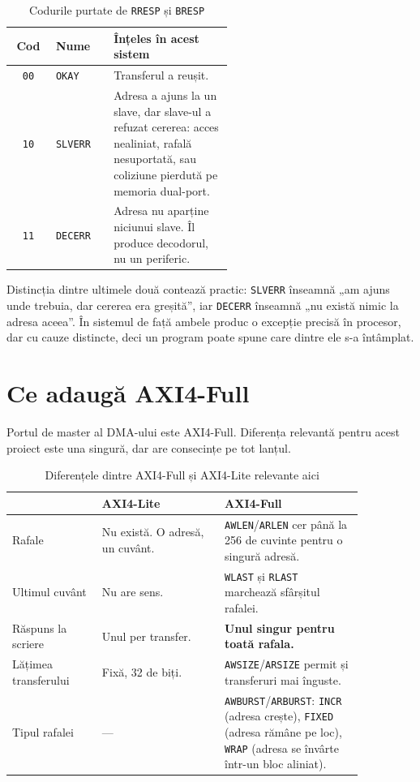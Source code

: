 \documentclass[11pt,openany]{report}
\newcommand{\sig}[1]{\texttt{#1}}
\begin{document}
\begin{table}[H]
\centering
\caption{Codurile purtate de \sig{RRESP} și \sig{BRESP}}
\label{tab:axiresp}
\small
\begin{tabular}{@{}clL{0.54\linewidth}@{}}
\toprule
\textbf{Cod} & \textbf{Nume} & \textbf{Înțeles în acest sistem} \\
\midrule
\texttt{00} & \sig{OKAY}   & Transferul a reușit. \\
\texttt{10} & \sig{SLVERR} & Adresa a ajuns la un slave, dar slave-ul a refuzat
              cererea: acces nealiniat, rafală nesuportată, sau coliziune
              pierdută pe memoria dual-port. \\
\texttt{11} & \sig{DECERR} & Adresa nu aparține niciunui slave. Îl produce
              decodorul, nu un periferic. \\
\bottomrule
\end{tabular}
\end{table}

Distincția dintre ultimele două contează practic: \sig{SLVERR} înseamnă „am
ajuns unde trebuia, dar cererea era greșită”, iar \sig{DECERR} înseamnă „nu
există nimic la adresa aceea”. În sistemul de față ambele produc o excepție
precisă în procesor, dar cu cauze distincte, deci un program poate spune care
dintre ele s-a întâmplat.

\section{Ce adaugă AXI4-Full}
\label{sec:axifull}

Portul de master al DMA-ului este AXI4-Full. Diferența relevantă pentru acest
proiect este una singură, dar are consecințe pe tot lanțul.

\begin{table}[H]
\centering
\caption{Diferențele dintre AXI4-Full și AXI4-Lite relevante aici}
\label{tab:fullvslite}
\small
\begin{tabular}{@{}L{0.22\linewidth}L{0.30\linewidth}L{0.34\linewidth}@{}}
\toprule
 & \textbf{AXI4-Lite} & \textbf{AXI4-Full} \\
\midrule
Rafale & Nu există. O adresă, un cuvânt. &
  \sig{AWLEN}/\sig{ARLEN} cer până la 256 de cuvinte pentru o singură adresă. \\
\addlinespace
Ultimul cuvânt & Nu are sens. &
  \sig{WLAST} și \sig{RLAST} marchează sfârșitul rafalei. \\
\addlinespace
Răspuns la scriere & Unul per transfer. &
  \textbf{Unul singur pentru toată rafala.} \\
\addlinespace
Lățimea transferului & Fixă, 32 de biți. &
  \sig{AWSIZE}/\sig{ARSIZE} permit și transferuri mai înguste. \\
\addlinespace
Tipul rafalei & --- &
  \sig{AWBURST}/\sig{ARBURST}: \sig{INCR} (adresa crește), \sig{FIXED} (adresa
  rămâne pe loc), \sig{WRAP} (adresa se învârte într-un bloc aliniat). \\
\bottomrule
\end{tabular}
\end{table}
\end{document}
